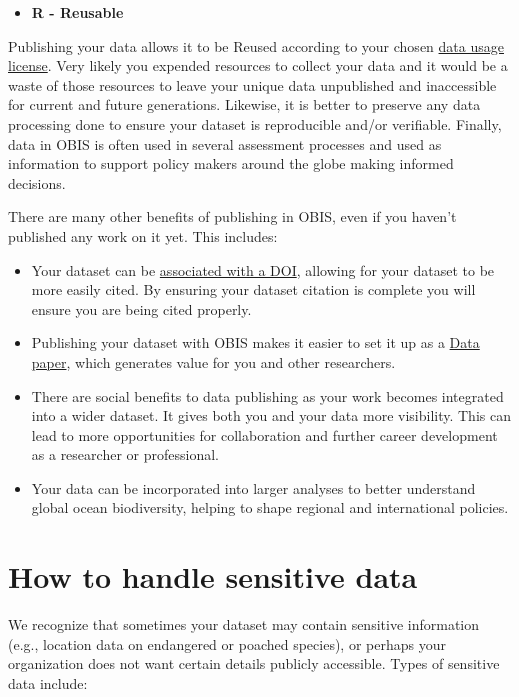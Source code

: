 \documentclass[
  letterpaper,
  DIV=11,
  numbers=noendperiod,
  oneside]{scrreprt}
\providecommand{\tightlist}{%
  \setlength{\itemsep}{0pt}\setlength{\parskip}{0pt}}\usepackage{longtable,booktabs,array}
\begin{document}
\begin{itemize}
\tightlist
\item
  \textbf{R - Reusable}
\end{itemize}

Publishing your data allows it to be Reused according to your chosen
\href{policy.html}{data usage license}. Very likely you expended
resources to collect your data and it would be a waste of those
resources to leave your unique data unpublished and inaccessible for
current and future generations. Likewise, it is better to preserve any
data processing done to ensure your dataset is reproducible and/or
verifiable. Finally, data in OBIS is often used in several assessment
processes and used as information to support policy makers around the
globe making informed decisions.

There are many other benefits of publishing in OBIS, even if you haven't
published any work on it yet. This includes:

\begin{itemize}
\tightlist
\item
  Your dataset can be
  \protect\hyperlink{adding-a-doi-to-datasets}{associated with a DOI},
  allowing for your dataset to be more easily cited. By ensuring your
  dataset citation is complete you will ensure you are being cited
  properly.
\item
  Publishing your dataset with OBIS makes it easier to set it up as a
  \href{https://www.gbif.org/data-papers}{Data paper}, which generates
  value for you and other researchers.
\item
  There are social benefits to data publishing as your work becomes
  integrated into a wider dataset. It gives both you and your data more
  visibility. This can lead to more opportunities for collaboration and
  further career development as a researcher or professional.
\item
  Your data can be incorporated into larger analyses to better
  understand global ocean biodiversity, helping to shape regional and
  international policies.
\end{itemize}

\hypertarget{how-to-handle-sensitive-data}{%
\section{How to handle sensitive
data}\label{how-to-handle-sensitive-data}}

We recognize that sometimes your dataset may contain sensitive
information (e.g., location data on endangered or poached species), or
perhaps your organization does not want certain details publicly
accessible. Types of sensitive data include:
\end{document}

